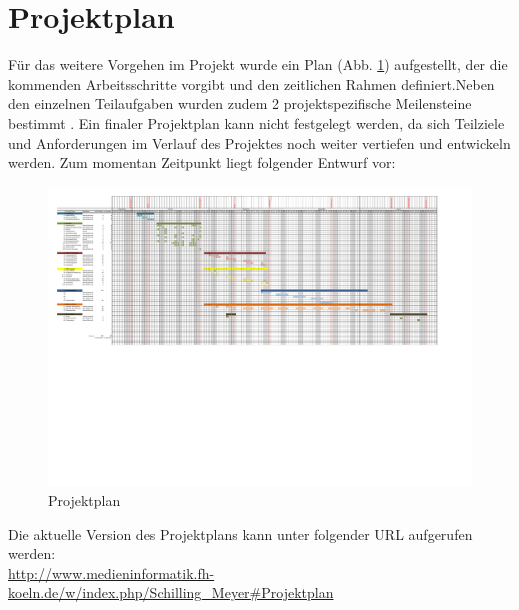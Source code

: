 
\section{Projektplan}
Für das weitere Vorgehen im Projekt wurde ein Plan (Abb. \ref{fig:projektplan}) aufgestellt, der die kommenden Arbeitsschritte vorgibt und den zeitlichen Rahmen definiert.Neben den einzelnen Teilaufgaben wurden zudem 2 projektspezifische Meilensteine bestimmt . Ein finaler Projektplan kann nicht festgelegt werden, da sich Teilziele und Anforderungen im Verlauf des Projektes noch weiter vertiefen und entwickeln werden. Zum momentan Zeitpunkt liegt folgender Entwurf vor:

\begin{figure}[H]
\includegraphics[width=.9\textwidth, trim=20 250 150 0]{./images/projektplan.pdf}
\caption{Projektplan}
\label{fig:projektplan}
\end{figure}

Die aktuelle Version des Projektplans kann unter folgender URL aufgerufen werden:\\
\url{http://www.medieninformatik.fh-koeln.de/w/index.php/Schilling_Meyer#Projektplan}
